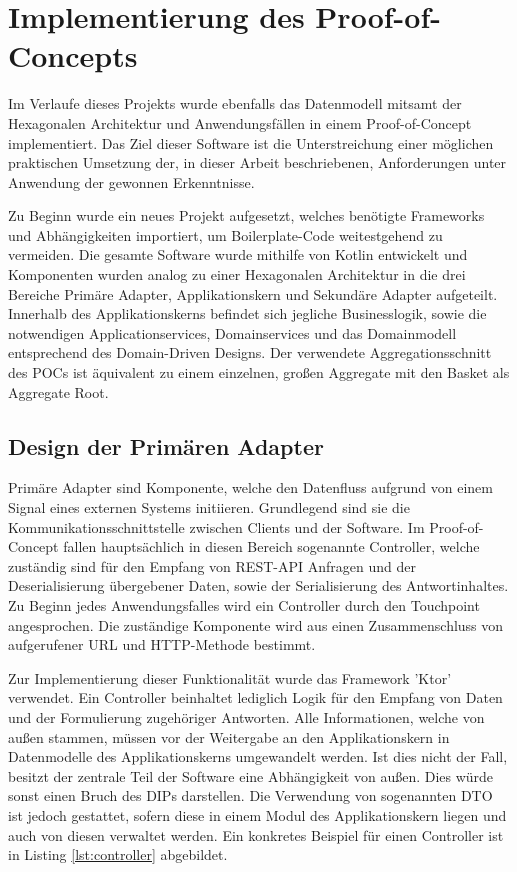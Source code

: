\chapter{Implementierung des Proof-of-Concepts}

Im Verlaufe dieses Projekts wurde ebenfalls das Datenmodell mitsamt der Hexagonalen Architektur und Anwendungsfällen in einem Proof-of-Concept implementiert. Das Ziel dieser Software ist die Unterstreichung einer möglichen praktischen Umsetzung der, in dieser Arbeit beschriebenen, Anforderungen unter Anwendung der gewonnen Erkenntnisse. 

Zu Beginn wurde ein neues Projekt aufgesetzt, welches benötigte Frameworks und Abhängigkeiten importiert, um Boilerplate-Code weitestgehend zu vermeiden. Die gesamte Software wurde mithilfe von Kotlin entwickelt und Komponenten wurden analog zu einer Hexagonalen Architektur in die drei Bereiche Primäre Adapter, Applikationskern und Sekundäre Adapter aufgeteilt. Innerhalb des Applikationskerns befindet sich jegliche Businesslogik, sowie die notwendigen Applicationservices, Domainservices und das Domainmodell entsprechend des Domain-Driven Designs. Der verwendete Aggregationsschnitt des POCs ist äquivalent zu einem einzelnen, großen Aggregate mit den Basket als Aggregate Root.


\section{Design der Primären Adapter}

Primäre Adapter sind Komponente, welche den Datenfluss aufgrund von einem Signal eines externen Systems initiieren. Grundlegend sind sie die Kommunikationsschnittstelle zwischen Clients und der Software. Im Proof-of-Concept fallen hauptsächlich in diesen Bereich sogenannte Controller, welche zuständig sind für den Empfang von REST-API Anfragen und der Deserialisierung übergebener Daten, sowie der Serialisierung des Antwortinhaltes. Zu Beginn jedes Anwendungsfalles wird ein Controller durch den Touchpoint angesprochen. Die zuständige Komponente wird aus einen Zusammenschluss von aufgerufener URL und HTTP-Methode bestimmt. 

Zur Implementierung dieser Funktionalität wurde das Framework 'Ktor' verwendet. Ein Controller beinhaltet lediglich Logik für den Empfang von Daten und der Formulierung zugehöriger Antworten. Alle Informationen, welche von außen stammen, müssen vor der Weitergabe an den Applikationskern in Datenmodelle des Applikationskerns umgewandelt werden. Ist dies nicht der Fall, besitzt der zentrale Teil der Software eine Abhängigkeit von außen. Dies würde sonst einen Bruch des \acrlong{DIP}s darstellen. Die Verwendung von sogenannten \acrfull{DTO} ist jedoch gestattet, sofern diese in einem Modul des Applikationskern liegen und auch von diesen verwaltet werden. Ein konkretes Beispiel für einen Controller ist in Listing \ref{lst:controller} abgebildet.

